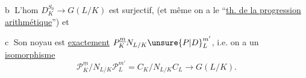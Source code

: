 \textcircled{b} L'hom $D_K^{S_0}\longrightarrow G(L/K)$ est surjectif, (et même on a le ``\uline{th. de la progression arithmétique}'') et

\textcircled{c} Son noyau est \uline{exactement} $P_K^{\underline m}N_{L/K}{\unsure{P|D}}_L^{m'}$, i.e. on a un \uline{isomorphisme}
\[
\mathscr{P}_K^{\underline m}/N_{L/K}\mathscr{P}_L^{m'}=C_K/N_{L/K}C_L\longrightarrow G(L/K).
\]
